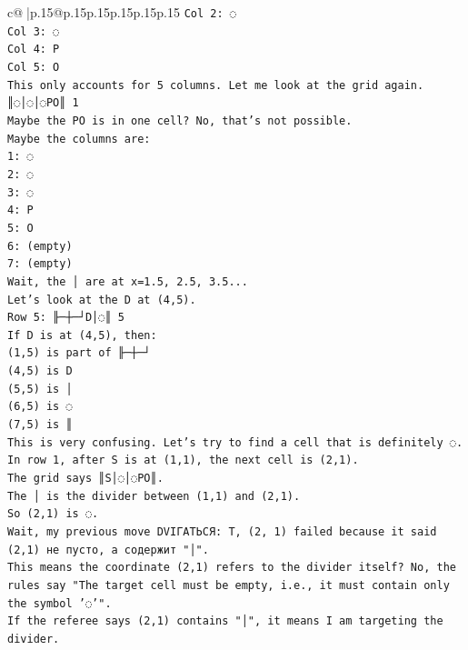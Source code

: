 \documentclass{article}
\begin{document}
{\begin{supertabular}{c@{$\;$}|p{.15\linewidth}@{}p{.15\linewidth}p{.15\linewidth}p{.15\linewidth}p{.15\linewidth}p{.15\linewidth}}
{{{\texttt{Col 2: ◌} \\
\texttt{Col 3: ◌} \\
\texttt{Col 4: P} \\
\texttt{Col 5: O} \\
\texttt{This only accounts for 5 columns. Let me look at the grid again.} \\
\texttt{║◌│◌│◌PO║ 1} \\
\texttt{Maybe the PO is in one cell? No, that's not possible.} \\
\texttt{Maybe the columns are:} \\
\texttt{1: ◌} \\
\texttt{2: ◌} \\
\texttt{3: ◌} \\
\texttt{4: P} \\
\texttt{5: O} \\
\texttt{6: (empty)} \\
\texttt{7: (empty)} \\
\texttt{Wait, the │ are at x=1.5, 2.5, 3.5...} \\
\texttt{Let's look at the D at (4,5).} \\
\texttt{Row 5: ╟─┼─┘D│◌║ 5} \\
\texttt{If D is at (4,5), then:} \\
\texttt{(1,5) is part of ╟─┼─┘} \\
\texttt{(4,5) is D} \\
\texttt{(5,5) is │} \\
\texttt{(6,5) is ◌} \\
\texttt{(7,5) is ║} \\
\texttt{This is very confusing. Let's try to find a cell that is definitely ◌.} \\
\texttt{In row 1, after S is at (1,1), the next cell is (2,1).} \\
\texttt{The grid says ║S│◌│◌PO║.} \\
\texttt{The │ is the divider between (1,1) and (2,1).} \\
\texttt{So (2,1) is ◌.} \\
\texttt{Wait, my previous move DVIГАТЬСЯ: T, (2, 1) failed because it said (2,1) не пусто, а содержит "│".} \\
\texttt{This means the coordinate (2,1) refers to the divider itself? No, the rules say "The target cell must be empty, i.e., it must contain only the symbol '◌'".} \\
\texttt{If the referee says (2,1) contains "│", it means I am targeting the divider.} \\
}}}
\end{supertabular}}
\end{document}
